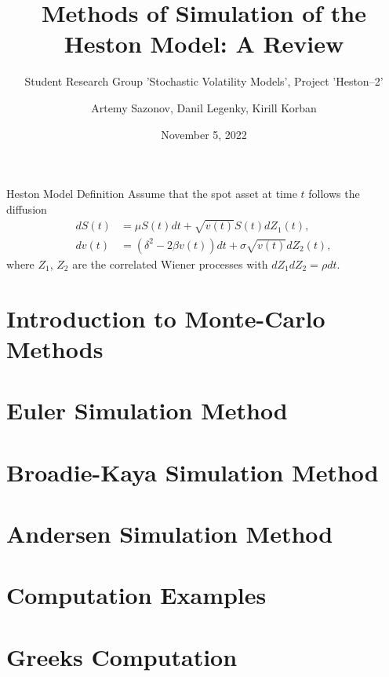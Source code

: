 \documentclass{vegapresentation}
\subtitle{Student Research Group 'Stochastic Volatility Models', Project 'Heston--2'}
\title{Methods of Simulation of the Heston Model: A Review}
\author{Artemy Sazonov, Danil Legenky, Kirill Korban}
\institute{Lomonosov Moscow State Univesity, Faculty of Mechanics and Mathematics}
\date{November 5, 2022}
\begin{document}
    \maketitle

    \begin{frame}{Heston Model Definition}
        Assume that the spot asset at time $t$ follows the diffusion
        \begin{align}
            dS(t) & = \mu S(t)dt + \sqrt{v(t)} S(t) dZ_1(t), \label{Heston:price}\\
            dv(t) & = \left(\delta^2 - 2\beta v(t)\right) dt + \sigma\sqrt{v(t)} dZ_2(t), \label{Heston:variance}
        \end{align}
        where $Z_1$, $Z_2$ are the correlated Wiener processes with $dZ_1dZ_2 = \rho dt$.
    \end{frame}

    
    \section{Introduction to Monte-Carlo Methods}
        

    \section{Euler Simulation Method}
        

    \section{Broadie-Kaya Simulation Method} 
        

    \section{Andersen Simulation Method}
        

    \section{Computation Examples}
        

    \section{Greeks Computation}
        
    
\end{document}
